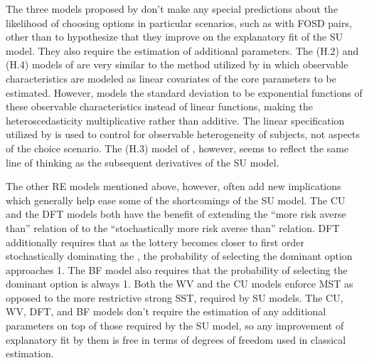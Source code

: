 \documentclass[../main.tex]{subfiles}
\begin{document}
The three models proposed by \textcite{Hey1995} don't make any special predictions about the likelihood of choosing options in particular scenarios, such as with FOSD pairs, other than to hypothesize that they improve on the explanatory fit of the SU model.
They also require the estimation of additional parameters.
The (H.2) and (H.4) models of \textcite{Hey1995} are very similar to the method utilized by \textcite[142]{Harrison2009} in which observable characteristics are modeled as linear covariates of the core parameters to be estimated.
However, \textcite{Hey1995} models the standard deviation to be exponential functions of these observable characteristics instead of linear functions, making the heteroscedasticity multiplicative rather than additive.
The linear specification utilized by \textcite{Harrison2009} is used to control for observable heterogeneity of subjects, not aspects of the choice scenario.
The (H.3) model of \textcite{Hey1995}, however, seems to reflect the same line of thinking as the subsequent derivatives of the SU model.

The other RE models mentioned above, however, often add new implications which generally help ease some of the shortcomings of the SU model.
The CU and the DFT models both have the benefit of extending the \enquote{more risk averse than} relation of \textcite{Pratt1964} to the \enquote{stochastically more risk averse than} relation.
DFT additionally requires that as the lottery becomes closer to first order stochastically dominating the {\CE}, the probability of selecting the dominant option approaches 1.
The BF model also requires that the probability of selecting the dominant option is always 1.
Both the WV and the CU models enforce MST as opposed to the more restrictive strong SST,  required by SU models.
The CU, WV, DFT, and BF models don't require the estimation of any additional parameters on top of those required by the SU model, so any improvement of explanatory fit by them is free in terms of degrees of freedom used in classical estimation.
\end{document}
